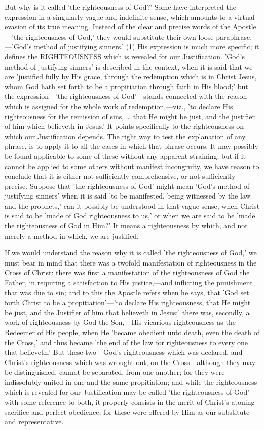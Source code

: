 \documentclass[
]{book}
\begin{document}
But why is it called 'the righteousness of God?' Some have interpreted the expression in a singularly vague and indefinite sense, which amounts to a virtual evasion of its true meaning. Instead of the clear and precise words of the Apostle---'the righteousness of God,' they would substitute their own loose paraphrase,---'God's method of justifying sinners.' (1) His expression is much more specific; it defines the RIGHTEOUSNESS which is revealed for our Justification. 'God's method of justifying sinners' is described in the context, when it is said that we are 'justified fully by His grace, through the redemption which is in Christ Jesus, whom God hath set forth to be a propitiation through faith in His blood;' but the expression---'the righteousness of God'---stands connected with the reason which is assigned for the whole work of redemption,---viz., 'to declare His righteousness for the remission of sins, \ldots{} that He might be just, and the justifier of him which believeth in Jesus.' It points specifically to the righteousness on which our Justification depends. The right way to test the explanation of any phrase, is to apply it to all the cases in which that phrase occurs. It may possibly be found applicable to some of these without any apparent straining; but if it cannot be applied to some others without manifest incongruity, we have reason to conclude that it is either not sufficiently comprehensive, or not sufficiently precise. Suppose that 'the righteousness of God' might mean 'God's method of justifying sinners' when it is said 'to be manifested, being witnessed by the law and the prophets,' can it possibly be understood in that vague sense, when Christ is said to be 'made of God righteousness to us,' or when we are said to be 'made the righteousness of God in Him?' It means a righteousness by which, and not merely a method in which, we are justified.

If we would understand the reason why it is called 'the righteousness of God,' we must bear in mind that there was a twofold manifestation of righteousness in the Cross of Christ: there was first a manifestation of the righteousness of God the Father, in requiring a satisfaction to His justice,---and inflicting the punishment that was due to sin; and to this the Apostle refers when he says, that 'God set forth Christ to be a propitiation'---'to declare His righteousness, that He might be just, and the Justifier of him that believeth in Jesus;' there was, secondly, a work of righteousness by God the Son,---His vicarious righteousness as the Redeemer of His people, when He 'became obedient unto death, even the death of the Cross,' and thus became 'the end of the law for righteousness to every one that believeth.' But these two---God's righteousness which was declared, and Christ's righteousness which was wrought out, on the Cross---although they may be distinguished, cannot be separated, from one another; for they were indissolubly united in one and the same propitiation; and while the righteousness which is revealed for our Justification may be called 'the righteousness of God' with some reference to both, it properly consists in the merit of Christ's atoning sacrifice and perfect obedience, for these were offered by Him as our substitute and representative.
\end{document}
